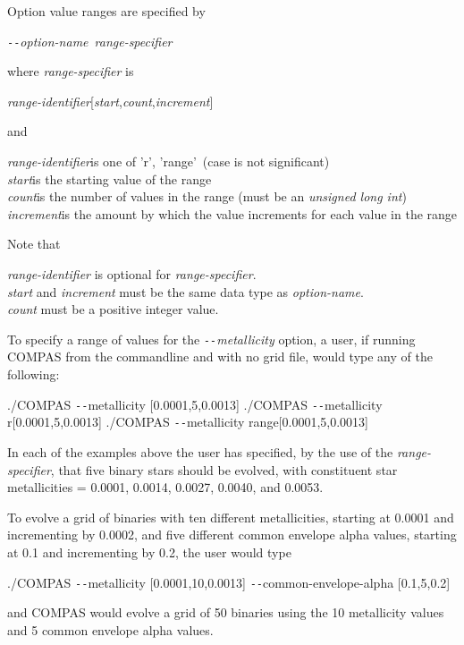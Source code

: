 Option value ranges are specified by

\tabto{3em}\texttt{-{}-}\textit{option-name}~\textit{range-specifier}

where \textit{range-specifier} is

\tabto{3em}\textit{range-identifier}[\textit{start},\textit{count},\textit{increment}]

and 

\textit{range-identifier}\tabto{7em}is one of \lcb'r', 'range'\rcb~(case is not significant)\\
\textit{start}\tabto{7em}is the starting value of the range\\
\textit{count}\tabto{7em}is the number of values in the range (must be an \textit{unsigned long int})\\
\textit{increment}\tabto{7em}is the amount by which the value increments for each value in the range

Note that

\textit{range-identifier} is optional for \textit{range-specifier}.\\
\textit{start} and \textit{increment} must be the same data type as \textit{option-name}.\\
\textit{count} must be a positive integer value.

To specify a range of values for the \textit{ \texttt{-{}-}metallicity} option, a user, if running COMPAS from the commandline and with no grid file, would type any of the following:

\tabto{3em}./COMPAS \texttt{-{}-}metallicity [0.0001,5,0.0013]
\tabto{3em}./COMPAS \texttt{-{}-}metallicity r[0.0001,5,0.0013]
\tabto{3em}./COMPAS \texttt{-{}-}metallicity range[0.0001,5,0.0013]

In each of the examples above the user has specified, by the use of the \textit{range-specifier}, that five binary stars should be evolved, with constituent star metallicities = 0.0001, 0.0014, 0.0027, 0.0040, and 0.0053.

To evolve a grid of binaries with ten different metallicities, starting at 0.0001 and incrementing by 0.0002, and five different common envelope alpha values, starting at 0.1 and incrementing by 0.2, the user would type

\tabto{3em}./COMPAS \texttt{-{}-}metallicity [0.0001,10,0.0013] \texttt{-{}-}common-envelope-alpha [0.1,5,0.2]

and COMPAS would evolve a grid of 50 binaries using the 10 metallicity values and 5 common envelope alpha values.

